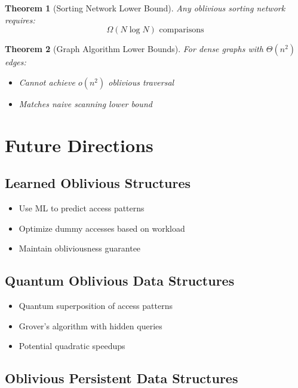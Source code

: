 \documentclass[11pt,final,hidelinks]{article}
\newtheorem{theorem}{Theorem}[section]
\begin{document}
\begin{theorem}[Sorting Network Lower Bound]
Any oblivious sorting network requires:
\begin{equation}
\Omega(N \log N) \text{ comparisons}
\end{equation}
\end{theorem}

\begin{theorem}[Graph Algorithm Lower Bounds]
For dense graphs with $\Theta(n^2)$ edges:
\begin{itemize}
    \item Cannot achieve $o(n^2)$ oblivious traversal
    \item Matches naive scanning lower bound
\end{itemize}
\end{theorem}

\section{Future Directions}

\subsection{Learned Oblivious Structures}

\begin{itemize}
    \item Use ML to predict access patterns
    \item Optimize dummy accesses based on workload
    \item Maintain obliviousness guarantee
\end{itemize}

\subsection{Quantum Oblivious Data Structures}

\begin{itemize}
    \item Quantum superposition of access patterns
    \item Grover's algorithm with hidden queries
    \item Potential quadratic speedups
\end{itemize}

\subsection{Oblivious Persistent Data Structures}
\end{document}
